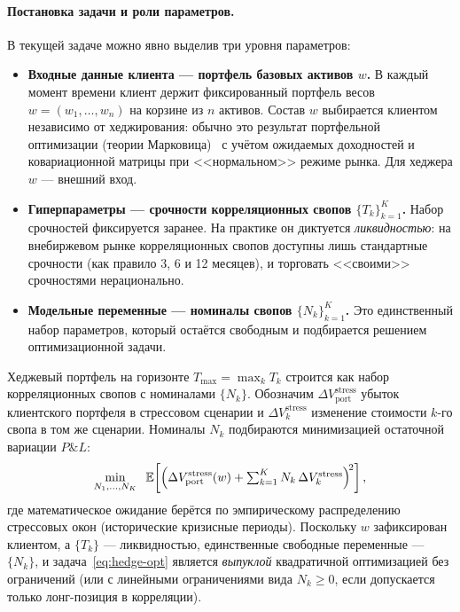 \paragraph{Постановка задачи и роли параметров.}
В текущей задаче можно явно выделив три уровня параметров:
\begin{itemize}
  \item \textbf{Входные данные клиента --- портфель базовых активов
        $w$.}
        В каждый момент времени клиент держит фиксированный портфель
        весов $w = (w_1,\dots,w_n)$ на корзине из $n$ активов. Состав
        $w$ выбирается клиентом независимо от хеджирования: обычно это
        результат портфельной оптимизации (теории
        Марковица)~\cite{markowitz1952portfolio} с учётом ожидаемых
        доходностей и ковариационной матрицы при <<нормальном>>
        режиме рынка. Для хеджера $w$ --- внешний вход.
  \item \textbf{Гиперпараметры --- срочности корреляционных свопов
        $\{T_k\}_{k=1}^{K}$.}
        Набор срочностей фиксируется заранее. На практике он диктуется
        \emph{ликвидностью}: на внебиржевом рынке корреляционных
        свопов доступны лишь стандартные срочности (как правило 3, 6
        и 12 месяцев), и торговать <<своими>> срочностями
        нерационально.
  \item \textbf{Модельные переменные --- номиналы свопов
        $\{N_k\}_{k=1}^{K}$.}
        Это единственный набор параметров, который остаётся
        свободным и подбирается решением оптимизационной задачи.
\end{itemize}
Хеджевый портфель на горизонте $T_{\max} = \max_k T_k$ строится как
набор корреляционных свопов с номиналами $\{N_k\}$. Обозначим
$\Delta V_{\text{port}}^{\text{stress}}$ убыток клиентского портфеля в
стрессовом сценарии и $\Delta V_k^{\text{stress}}$ изменение стоимости
$k$-го свопа в том же сценарии. Номиналы $N_k$ подбираются
минимизацией оста\-точной вариации $P\&L$:
\begin{equation}
\label{eq:hedge-opt}
  \min_{N_1,\dots,N_K} \;\;
  \mathbb{E}\!\left[\Bigl(\Delta V_{\text{port}}^{\text{stress}}(w)
                  + \textstyle\sum_{k=1}^{K} N_k\,\Delta V_k^{\text{stress}}\Bigr)^{\!2}\right],
\end{equation}
где математическое ожидание берётся по эмпирическому распределению
стрессовых окон (исторические кризисные периоды). Поскольку $w$
зафиксирован клиентом, а $\{T_k\}$ --- ликвидностью, единственные
свободные переменные --- $\{N_k\}$, и задача~\eqref{eq:hedge-opt}
является \emph{выпуклой} квадратичной оптимизацией без ограничений
(или с линейными ограничениями вида $N_k \ge 0$, если допускается
только лонг-позиция в корреляции).


